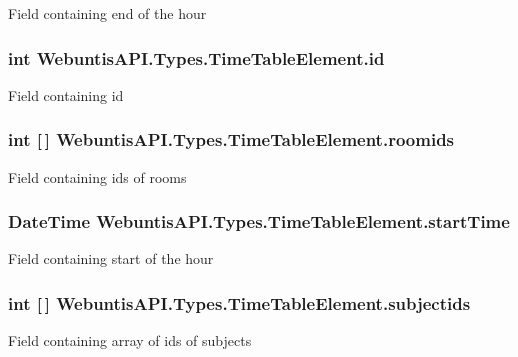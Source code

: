Field containing end of the hour \hypertarget{struct_webuntis_a_p_i_1_1_types_1_1_time_table_element_a3d6f4d06843dbad8ddbdbd21e2aea0b6}{
\subsubsection[{id}]{\setlength{\rightskip}{0pt plus 5cm}int Webuntis\-A\-P\-I.\-Types.\-Time\-Table\-Element.\-id}}\label{struct_webuntis_a_p_i_1_1_types_1_1_time_table_element_a3d6f4d06843dbad8ddbdbd21e2aea0b6}
Field containing id \hypertarget{struct_webuntis_a_p_i_1_1_types_1_1_time_table_element_add1b2a25e2b6c0c7cb02ef57c6b2ea6b}{
\subsubsection[{roomids}]{\setlength{\rightskip}{0pt plus 5cm}int \mbox{[}$\,$\mbox{]} Webuntis\-A\-P\-I.\-Types.\-Time\-Table\-Element.\-roomids}}\label{struct_webuntis_a_p_i_1_1_types_1_1_time_table_element_add1b2a25e2b6c0c7cb02ef57c6b2ea6b}
Field containing ids of rooms \hypertarget{struct_webuntis_a_p_i_1_1_types_1_1_time_table_element_a9a7059aea921d721fea81b09882c8b2f}{
\subsubsection[{start\-Time}]{\setlength{\rightskip}{0pt plus 5cm}Date\-Time Webuntis\-A\-P\-I.\-Types.\-Time\-Table\-Element.\-start\-Time}}\label{struct_webuntis_a_p_i_1_1_types_1_1_time_table_element_a9a7059aea921d721fea81b09882c8b2f}
Field containing start of the hour \hypertarget{struct_webuntis_a_p_i_1_1_types_1_1_time_table_element_a3603be7f40d3358ce0f1a9a0b583cae6}{
\subsubsection[{subjectids}]{\setlength{\rightskip}{0pt plus 5cm}int \mbox{[}$\,$\mbox{]} Webuntis\-A\-P\-I.\-Types.\-Time\-Table\-Element.\-subjectids}}\label{struct_webuntis_a_p_i_1_1_types_1_1_time_table_element_a3603be7f40d3358ce0f1a9a0b583cae6}
Field containing array of ids of subjects 

